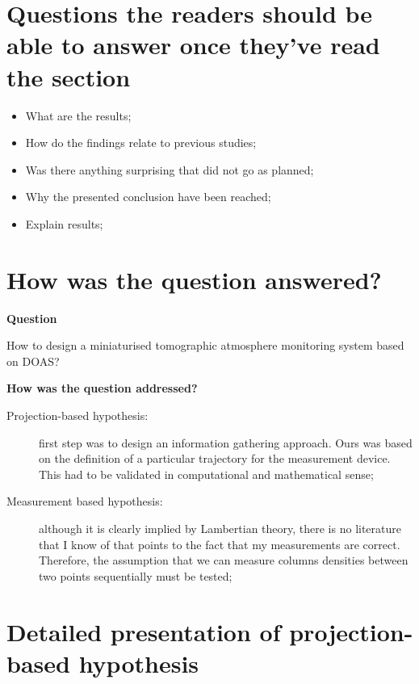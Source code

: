 \section{Questions the readers should be able to answer once they've
read the section}%
\label{sec:questions_the_readers_should_be_able_to_answer_once_they_ve_read_the_section}
\begin{itemize}
    \item What are the results;
    \item How do the findings relate to previous studies;
    \item Was there anything surprising that did not go as planned;
    \item Why the presented conclusion have been reached;
    \item Explain results;
\end{itemize}


\section{How was the question answered?}%
\label{sec:how_was_the_question_answered_}
\textbf{Question}

How to design a miniaturised tomographic atmosphere monitoring system
based on DOAS?

\textbf{How was the question addressed?}

\begin{description}
    \item[Projection-based hypothesis:]first step was to design an
        information gathering approach. Ours was based on the definition
        of a particular trajectory for the measurement device. This had
        to be validated in computational and mathematical sense;
    \item[Measurement based hypothesis:] although it is clearly implied
        by Lambertian theory, there is no literature that I know of that
        points to the fact that my measurements are correct. Therefore,
        the assumption that we can measure columns densities between two
        points sequentially must be tested;
\end{description}

\section{Detailed presentation of projection-based hypothesis}%
\label{sec:detailed_presentation_of_projection_based_hypothesis}

